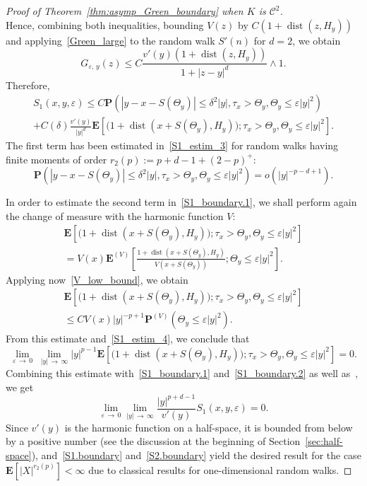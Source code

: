 \documentclass[AHL,Unicode,longabstracts,published]{cedram}
\DeclareMathOperator{\dist}{dist}
\newcommand{\clC}{\mathcal{C}}
\newcommand{\pr}{\mathbf{P}}
\newcommand{\e}{\mathbf{E}}
\renewcommand{\le}{\leqslant}
\renewcommand{\leq}{\leqslant}
\begin{document}
\begin{proof}[Proof of Theorem~\ref{thm:asymp_Green_boundary} when $K$ is $\clC^{2}$]
\[\]
Hence, combining both inequalities, bounding $V(z)$ by $C(1+\dist(z,H_y))$ and applying~\eqref{Green_large} to the random walk $S'(n)$ for $d=2$, we obtain
\[
G_{\varepsilon,\,y}(z)\leq C\frac{v'(y)\left(1+\dist(z,H_y)\right)}{1+|z-y|^d}\wedge1.
\]
Therefore,
\begin{multline}\label{S1_boundary.1}
S_1(x,y,\varepsilon)
\le C\pr\left(\left|y-x-S(\Theta_y)\right|\le\delta^2|y|,\tau_x>\Theta_y,\Theta_y\le\varepsilon|y|^2\right)\\
+C(\delta)\frac{v'(y)}{|y|^d}\e\left[\big(1+\dist\left(x+S\left(\Theta_y\right),H_y\right)\big);
\tau_x>\Theta_y,\Theta_y\le\varepsilon|y|^2\right].
\end{multline}
The first term has been estimated in~\eqref{S1_estim_3} for random walks having finite moments of order $r_2(p):=p+d-1+(2-p)^+$:
\begin{equation}\label{S1_boundary.2}
\pr\left(\left|y-x-S\left(\Theta_y\right)\right|\le\delta^2|y|,\tau_x>\Theta_y,\Theta_y\le\varepsilon|y|^2\right) =o\left(|y|^{-p-d+1}\right).
\end{equation}

In order to estimate the second term in~\eqref{S1_boundary.1}, we shall perform again the change of measure with the harmonic function $V$:
\begin{multline*}
\e\left[\big(1+\dist\left(x+S\left(\Theta_y\right),H_y\right)\big);\tau_x>\Theta_y,\Theta_y\le\varepsilon|y|^2\right]\\
=V(x)\e^{(V)}\left[\frac{1+\dist\left(x+S\left(\Theta_y\right),H_y\right)}{V\left(x+S\left(\Theta_y\right)\right)};
\Theta_y\le\varepsilon|y|^2\right].
\end{multline*}
Applying now~\eqref{V_low_bound}, we obtain
\begin{multline*}
\e\left[\big(1+\dist\left(x+S\left(\Theta_y\right),H_y\right)\big);\tau_x>\Theta_y,\Theta_y\le\varepsilon|y|^2\right]\\
\le CV(x)|y|^{-p+1}\pr^{(V)}\left(\Theta_y\le\varepsilon|y|^2\right).
\end{multline*}
From this estimate and~\eqref{S1_estim_4}, we conclude that
\[
\lim_{\varepsilon\,\to\,0}\;\lim_{|y|\,\to\,\infty}|y|^{p-1}
\e\left[\big(1+\dist\left(x+S\left(\Theta_y\right),H_y\right)\big);\tau_x>\Theta_y,\Theta_y\le\varepsilon|y|^2\right]=0.
\]
Combining this estimate with~\eqref{S1_boundary.1} and~\eqref{S1_boundary.2} as well as~\cite[Lemma~13]{DeWa-15}, we get
\begin{equation}\label{S1.boundary}
\lim_{\varepsilon\,\to\,0}\lim_{|y|\,\to\,\infty}
\frac{|y|^{p+d-1}}{v'(y)}S_1(x,y,\varepsilon)=0.
\end{equation}
Since $v'(y)$ is the harmonic function on a half-space, it is bounded from below by a positive number (see the discussion at the beginning of Section~\ref{sec:half-space}), and~\eqref{S1.boundary} and~\eqref{S2.boundary} yield the desired result for the case $\e[|X|^{r_2(p)}]<\infty$ due to classical results for one-dimensional random walks.


\end{proof}
\end{document}
